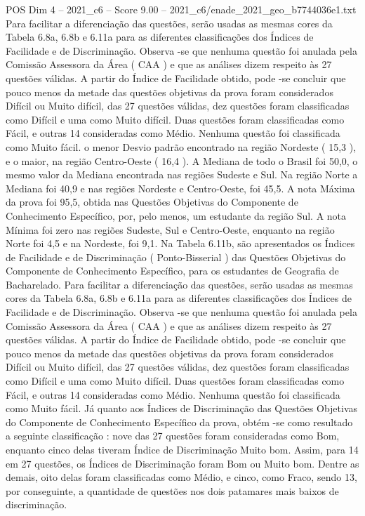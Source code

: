 \begin{textsample}{POS Dim 4 – 2021\_c6 – Score 9.00 – 2021\_c6/enade\_2021\_geo\_b7744036e1.txt}
Para facilitar a diferenciação das questões, serão usadas as mesmas cores da Tabela 6.8a, 6.8b e 6.11a para as diferentes classificações dos Índices de Facilidade e de Discriminação.
Observa -se que nenhuma questão foi anulada pela Comissão Assessora da Área ( CAA ) e que as análises dizem respeito às 27 questões válidas.
A partir do Índice de Facilidade obtido, pode -se concluir que pouco menos da metade das questões objetivas da prova foram considerados Difícil ou Muito difícil, das 27 questões válidas, dez questões foram classificadas como Difícil e uma como Muito difícil.
Duas questões foram classificadas como Fácil, e outras 14 consideradas como Médio.
Nenhuma questão foi classificada como Muito fácil. o menor Desvio padrão encontrado na região Nordeste ( 15,3 ), e o maior, na região Centro-Oeste ( 16,4 ).
A Mediana de todo o Brasil foi 50,0, o mesmo valor da Mediana encontrada nas regiões Sudeste e Sul.
Na região Norte a Mediana foi 40,9 e nas regiões Nordeste e Centro-Oeste, foi 45,5.
A nota Máxima da prova foi 95,5, obtida nas Questões Objetivas do Componente de Conhecimento Específico, por, pelo menos, um estudante da região Sul.
A nota Mínima foi zero nas regiões Sudeste, Sul e Centro-Oeste, enquanto na região Norte foi 4,5 e na Nordeste, foi 9,1.
Na Tabela 6.11b, são apresentados os Índices de Facilidade e de Discriminação ( Ponto-Bisserial ) das Questões Objetivas do Componente de Conhecimento Específico, para os estudantes de Geografia de Bacharelado.
Para facilitar a diferenciação das questões, serão usadas as mesmas cores da Tabela 6.8a, 6.8b e 6.11a para as diferentes classificações dos Índices de Facilidade e de Discriminação.
Observa -se que nenhuma questão foi anulada pela Comissão Assessora da Área ( CAA ) e que as análises dizem respeito às 27 questões válidas.
A partir do Índice de Facilidade obtido, pode -se concluir que pouco menos da metade das questões objetivas da prova foram considerados Difícil ou Muito difícil, das 27 questões válidas, dez questões foram classificadas como Difícil e uma como Muito difícil.
Duas questões foram classificadas como Fácil, e outras 14 consideradas como Médio.
Nenhuma questão foi classificada como Muito fácil.
Já quanto aos Índices de Discriminação das Questões Objetivas do Componente de Conhecimento Específico da prova, obtém -se como resultado a seguinte classificação : nove das 27 questões foram consideradas como Bom, enquanto cinco delas tiveram Índice de Discriminação Muito bom.
Assim, para 14 em 27 questões, os Índices de Discriminação foram Bom ou Muito bom.
Dentre as demais, oito delas foram classificadas como Médio, e cinco, como Fraco, sendo 13, por conseguinte, a quantidade de questões nos dois patamares mais baixos de discriminação.

\end{textsample}
